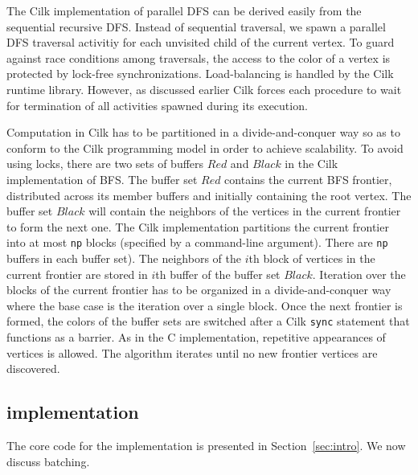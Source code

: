 The Cilk implementation of parallel DFS can be derived easily from the
sequential recursive DFS. Instead of sequential traversal, we spawn a
parallel DFS traversal activitiy for each unvisited child of the
current vertex. To guard against race conditions among traversals, the
access to the color of a vertex is protected by lock-free
synchronizations. Load-balancing is handled by the Cilk runtime
library. However, as discussed earlier Cilk forces each procedure to
wait for termination of all activities spawned during its execution.

Computation in Cilk has to be partitioned in a divide-and-conquer way
so as to conform to the Cilk programming model in order to achieve
scalability. To avoid using locks, there are two sets of buffers $Red$
and $Black$ in the Cilk implementation of BFS.  The buffer set $Red$
contains the current BFS frontier, distributed across its member
buffers and initially containing the root vertex. The buffer set
$Black$ will contain the neighbors of the vertices in the current
frontier to form the next one. The Cilk implementation partitions the
current frontier into at most {\tt np} blocks (specified by a
command-line argument). There 
are {\tt np} buffers in each buffer set). The neighbors of
the $i$th block of vertices in the current frontier are stored in
$i$th buffer of the buffer set $Black$. Iteration over the blocks of
the current frontier has to be organized in a divide-and-conquer way
where the base case is the iteration over a single block. Once the
next frontier is formed, the colors of the buffer sets are switched
after a Cilk {\tt sync} statement that functions as a barrier.  As in
the C implementation, repetitive appearances of vertices is
allowed. The algorithm iterates until no new frontier vertices are
discovered.


\subsection{\XWS{} implementation}\label{sec:Performance}

The core code for the \XWS{} implementation is presented in 
Section~\ref{sec:intro}.  We now discuss batching.



